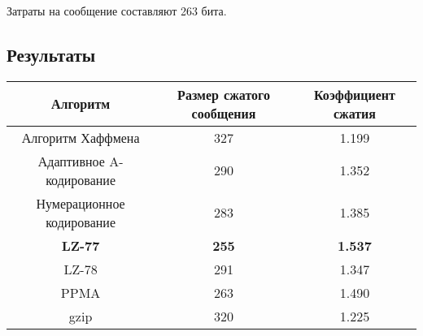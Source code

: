 Затраты на сообщение составляют 263 бита.

\subsection{Результаты}

\begin{tabular}{|c|c|c|}
\hline
Алгоритм & Размер сжатого сообщения & Коэффициент сжатия\\
\hline
Алгоритм Хаффмена & 327 & 1.199\\
\hline
Адаптивное A-кодирование & 290 & 1.352\\
\hline
Нумерационное кодирование & 283 & 1.385\\
\hline
\bf{LZ-77} & \bf{255} & \bf{1.537}\\
\hline
LZ-78 & 291 & 1.347\\
\hline
PPMA & 263 & 1.490\\
\hline
gzip & 320 & 1.225\\
\hline
\end{tabular}

